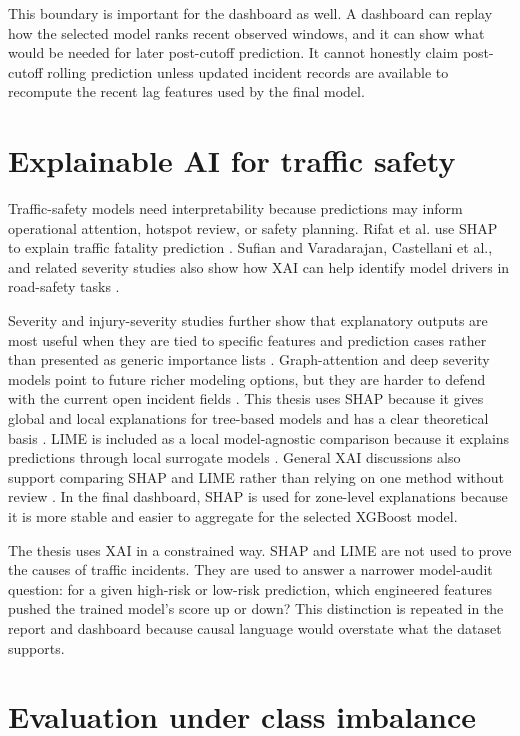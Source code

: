 This boundary is important for the dashboard as well. A dashboard can replay how the selected model ranks recent observed windows, and it can show what would be needed for later post-cutoff prediction. It cannot honestly claim post-cutoff rolling prediction unless updated incident records are available to recompute the recent lag features used by the final model.

\section{Explainable AI for traffic safety}

Traffic-safety models need interpretability because predictions may inform operational attention, hotspot review, or safety planning. Rifat et al. use SHAP to explain traffic fatality prediction \cite{rifat2024explainable}. Sufian and Varadarajan, Castellani et al., and related severity studies also show how XAI can help identify model drivers in road-safety tasks \cite{sufian2023severity,castellani2025severity}.

Severity and injury-severity studies further show that explanatory outputs are most useful when they are tied to specific features and prediction cases rather than presented as generic importance lists \cite{chakraborty2021severity,bibb2025severity}. Graph-attention and deep severity models point to future richer modeling options, but they are harder to defend with the current open incident fields \cite{nobin2025starn}. This thesis uses SHAP because it gives global and local explanations for tree-based models and has a clear theoretical basis \cite{lundberg2017shap}. LIME is included as a local model-agnostic comparison because it explains predictions through local surrogate models \cite{ribeiro2016lime}. General XAI discussions also support comparing SHAP and LIME rather than relying on one method without review \cite{salih2023xai}. In the final dashboard, SHAP is used for zone-level explanations because it is more stable and easier to aggregate for the selected XGBoost model.

The thesis uses XAI in a constrained way. SHAP and LIME are not used to prove the causes of traffic incidents. They are used to answer a narrower model-audit question: for a given high-risk or low-risk prediction, which engineered features pushed the trained model's score up or down? This distinction is repeated in the report and dashboard because causal language would overstate what the dataset supports.

\section{Evaluation under class imbalance}

